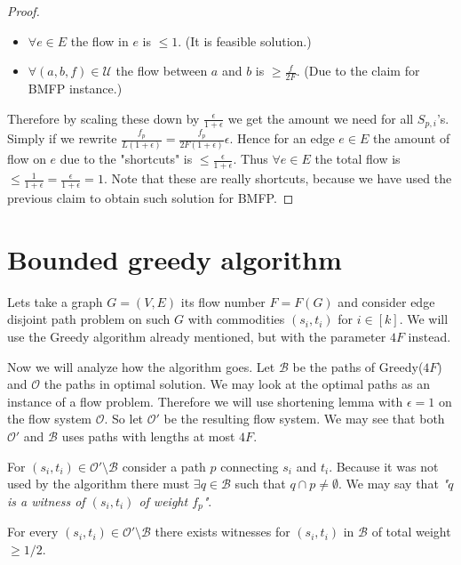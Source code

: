 \begin{proof}
	\begin{itemize}
		\item $\forall e \in E$ the flow in $e$ is $\leq 1$. (It is feasible solution.)
		\item $\forall (a, b, f) \in \mathcal{U}$ the flow between $a$ and $b$ is $\geq \frac{f}{2F}$. (Due to the claim for BMFP instance.)
	\end{itemize}
	
	Therefore by scaling these down by $\frac{\epsilon}{1 + \epsilon}$ we get the amount we need for all $S_{p,i}$'s. Simply if we rewrite $\frac{f_{p}}{L(1 + \epsilon)} = \frac{f_{p}}{2F(1 + \epsilon)}\epsilon$. Hence for an edge $e \in E$ the amount of flow on $e$ due to the "shortcuts" is $\leq \frac{\epsilon}{1+\epsilon}$. Thus $\forall e \in E$ the total flow is $\leq \frac{1}{1 + \epsilon} = \frac{\epsilon}{1+\epsilon} = 1$. Note that these are really shortcuts, because we have used the previous claim to obtain such solution for BMFP.
\end{proof}

\section{Bounded greedy algorithm}

Lets take a graph $G = (V,E)$ its flow number $F = F(G)$ and consider edge disjoint path problem on such $G$ with commodities $(s_{i}, t_{i})$ for $i \in [k]$. We will use the Greedy algorithm already mentioned, but with the parameter $4F$ instead.

Now we will analyze how the algorithm goes. Let $\mathcal{B}$ be the paths of Greedy($4F$) and $\mathcal{O}$ the paths in optimal solution. We may look at the optimal paths as an instance of a flow problem. Therefore we will use shortening lemma with $\epsilon = 1$ on the flow system $\mathcal{O}$. So let $\mathcal{O}'$ be the resulting flow system. We may see that both $\mathcal{O}'$ and $\mathcal{B}$ uses paths with lengths at most $4F$.

For $(s_{i}, t_{i}) \in \mathcal{O}' \setminus \mathcal{B}$ consider a path $p$ connecting $s_{i}$ and $t_{i}$. Because it was not used by the algorithm there must $\exists q \in \mathcal{B}$ such that $q \cap p \neq \emptyset$. We may say that \textit{"$q$ is a witness of $(s_{i},t_{i})$ of weight $f_{p}$"}.

\begin{observ}
	For every $(s_{i}, t_{i}) \in \mathcal{O}' \setminus \mathcal{B}$ there exists witnesses for $(s_{i}, t_{i})$ in $\mathcal{B}$ of total weight $\geq 1/2$.
\end{observ}

